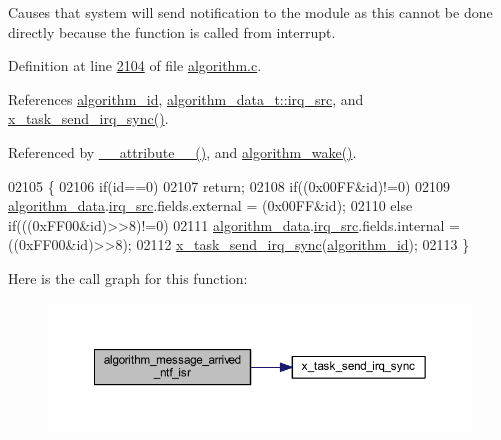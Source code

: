 Causes that system will send notification to the module as this cannot be done directly because the function is called from interrupt. 



Definition at line \hyperlink{a00038_source_l02104}{2104} of file \hyperlink{a00038_source}{algorithm.\+c}.



References \hyperlink{a00038_source_l00034}{algorithm\+\_\+id}, \hyperlink{a00016_a1aafd556b3c9ed3e5295b17dbd80cab8}{algorithm\+\_\+data\+\_\+t\+::irq\+\_\+src}, and \hyperlink{a00037_source_l00521}{x\+\_\+task\+\_\+send\+\_\+irq\+\_\+sync()}.



Referenced by \hyperlink{a00030_source_l00658}{\+\_\+\+\_\+attribute\+\_\+\+\_\+()}, and \hyperlink{a00038_source_l00670}{algorithm\+\_\+wake()}.


\begin{DoxyCode}
02105 \{
02106     \textcolor{keywordflow}{if}(\textcolor{keywordtype}{id}==0)
02107         \textcolor{keywordflow}{return};
02108     \textcolor{keywordflow}{if}((0x00FF&\textcolor{keywordtype}{id})!=0)
02109     \hyperlink{a00038_a183caa40cd01e79ee309cc9c4a225197}{algorithm\_data}.\hyperlink{a00016_a1aafd556b3c9ed3e5295b17dbd80cab8}{irq\_src}.fields.external = (0x00FF&id);
02110     \textcolor{keywordflow}{else} \textcolor{keywordflow}{if}(((0xFF00&\textcolor{keywordtype}{id})>>8)!=0)
02111     \hyperlink{a00038_a183caa40cd01e79ee309cc9c4a225197}{algorithm\_data}.\hyperlink{a00016_a1aafd556b3c9ed3e5295b17dbd80cab8}{irq\_src}.fields.internal = ((0xFF00&\textcolor{keywordtype}{id})>>8);
02112     \hyperlink{a00036_a9953756bc7c83e5f2c36830396136e75}{x\_task\_send\_irq\_sync}(\hyperlink{a00038_aff3e3d622fcd96787628167d3c1856f9}{algorithm\_id});
02113 \}
\end{DoxyCode}


Here is the call graph for this function\+:\nopagebreak
\begin{figure}[H]
\begin{center}
\leavevmode
\includegraphics[width=350pt]{d8/d41/a00038_a85471d58eae93d5d7e7e2b52e2b915d3_cgraph}
\end{center}
\end{figure}




